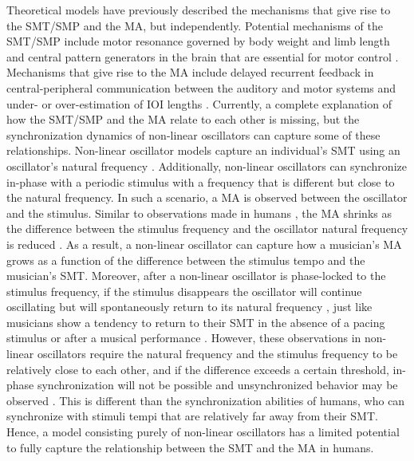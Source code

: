 \documentclass{report}
\begin{document}
Theoretical models have previously described the mechanisms that give rise to the SMT/SMP and the MA, but independently. Potential mechanisms of the SMT/SMP include motor resonance governed by body weight and limb length \cite{goodman2000advantages} and central pattern generators in the brain that are essential for motor control \cite{latash1992virtual, wolpert2007probabilistic}. Mechanisms that give rise to the MA include delayed recurrent feedback in central-peripheral communication between the auditory and motor systems \cite{stepp2010strong, roman2019delayed, aschersleben2002temporal} and under- or over-estimation of IOI lengths \cite{loehr2009subdividing}. Currently, a complete explanation of how the SMT/SMP and the MA relate to each other is missing, but the synchronization dynamics of non-linear oscillators can capture some of these relationships. Non-linear oscillator models capture an individual's SMT using an oscillator's natural frequency \cite{large2002tracking, large2002perceiving, mcauley2006time}. Additionally, non-linear oscillators can synchronize in-phase with a periodic stimulus with a frequency that is different but close to the natural frequency. In such a scenario, a MA is observed between the oscillator and the stimulus. Similar to observations made in humans \cite{scheurich2018tapping}, the MA shrinks as the difference between the stimulus frequency and the oscillator natural frequency is reduced \cite{kim2015signal, kim2019mode}. As a result, a non-linear oscillator can capture how a musician's MA grows as a function of the difference between the stimulus tempo and the musician's SMT. Moreover, after a non-linear oscillator is phase-locked to the stimulus frequency, if the stimulus disappears the oscillator will continue oscillating but will spontaneously return to its natural frequency \cite{kim2015signal, kim2019mode}, just like musicians show a tendency to return to their SMT in the absence of a pacing stimulus \cite{zamm2018musicians} or after a musical performance \cite{zamm2016endogenous}. However, these observations in non-linear oscillators require the natural frequency and the stimulus frequency to be relatively close to each other, and if the difference exceeds a certain threshold, in-phase synchronization will not be possible and unsynchronized behavior may be observed \cite{kim2015signal, kim2019mode}. This is different than the synchronization abilities of humans, who can synchronize with stimuli tempi that are relatively far away from their SMT. Hence, a model consisting purely of non-linear oscillators has a limited potential to fully capture the relationship between the SMT and the MA in humans.
\end{document}
